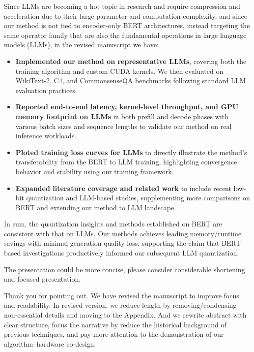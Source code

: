 \begin{revmeta}[]
Since LLMs are becoming a hot topic in research and require compression and acceleration due to their large parameter and computation complexity, and since our method is not tied to encoder-only BERT architectures, instead targeting the same operator family that are also the fundamental operations in large language models (LLMs), in the revised manuscript we have: 
\begin{itemize}
    \item \textbf{Implemented our method on representative LLMs}, covering both the training algorithm and custom CUDA kernels. We then evaluated on WikiText-2, C4, and CommonsenseQA benchmarks following standard LLM evaluation practices.
    \item \textbf{Reported end-to-end latency, kernel-level throughput, and GPU memory footprint on LLMs} in both prefill and decode phases with various batch sizes and sequence lengths to validate our method on real inference workloads. 
    \item \textbf{Ploted training loss curves for LLMs} to directly illustrate the method's transferability from the BERT to LLM training, highlighting convergence behavior and stability using our training framework. 
    \item \textbf{Expanded literature coverage and related work} to include recent low-bit quantization and LLM-based studies, supplementing more comparisons on BERT and extending our method to LLM landscape. 
\end{itemize}

In sum, the quantization insights and methods established on BERT are consistent with that on LLMs. Our methods achieves leading memory/runtime savings with minimal generation quality loss, supporting the claim that BERT-based investigations productively informed our subsequent LLM quantization. 

\end{revmeta}



\begin{revcommentToAssociateEditor}
The presentation could be more concise, please consider considerable shortening and focused presentation. 
\end{revcommentToAssociateEditor}
\begin{revmeta}[]

Thank you for pointing out. We have revised the manuscript to improve focus and readability. In revised version, we reduce length by removing/condensing non-essential details and moving  to the Appendix. 
And we rewrite abstract with clear structure, focus the narrative by reduce the historical background of previous techniques, and pay more attention to the demonstration of our algorithm–hardware co-design. 

\end{revmeta}


